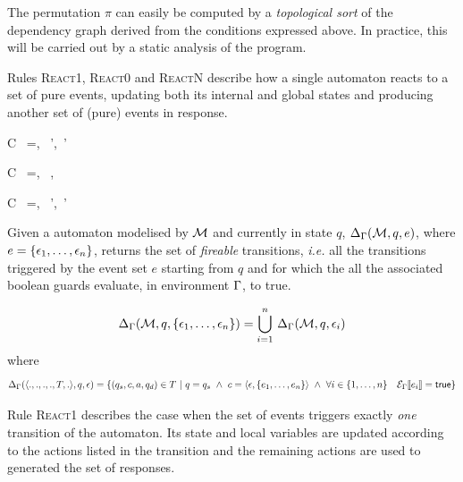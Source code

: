 The permutation $\pi$ can easily be computed by a \emph{topological sort} of the dependency graph
derived from the conditions expressed above. In practice, this will be carried out by a static
analysis of the program. 

\step Rules \textsc{React1}, \textsc{React0} and \textsc{ReactN} describe how a single automaton reacts to a
set of pure events, updating both its internal and global states and producing another set of (pure)
events in response.

\begin{multicols}{2}
{C \vdash\ \mu=,\ \env {} \mu',\ \env'}

{C \vdash\ \mu=,\ \env {} \mu,\ \env}
\end{multicols}

{C \vdash\ \mu=,\ \env {} \mu',\ \env'}

Given a automaton modelised by $\mathcal{M}$ and currently in state $q$, $\Delta_\Gamma(\mathcal{M},q,e)$, where
$e=\{\epsilon_1,\ldots,\epsilon_n\}$, returns
the set of \emph{fireable} transitions, \emph{i.e.} all the transitions triggered by the event set
$e$ starting from $q$ and for which the all the associated boolean guards evaluate, in environment $\Gamma$, to
\textsf{true}.

\begin{equation*}
  \Delta_\Gamma(\mathcal{M},q,\{\epsilon_1,\ldots,\epsilon_n\}) = \displaystyle{\bigcup_{i=1}^{n}}~\Delta_\Gamma(\mathcal{M},q,\epsilon_i)
\end{equation*}
where
\begin{equation*}
 \Delta_\Gamma(\langle., ., ., ., T, .\rangle,q,\epsilon) = \{ (q_s,c,a,q_d) \in T ~|~
  q=q_s ~\wedge~ c = \langle\epsilon, \{e_1,\ldots,e_n\}\rangle ~\wedge~ \forall i\in\{1,\ldots,n\}\quad \mathcal{E}_{\Gamma}\llbracket e_i \rrbracket = \mathsf{true} \}
\end{equation*}


Rule \textsc{React1} describes the case when the set of events triggers exactly \emph{one} transition
of the automaton. Its state and local variables are updated according to the actions listed in the
transition and the remaining actions are used to generated the set of responses.

